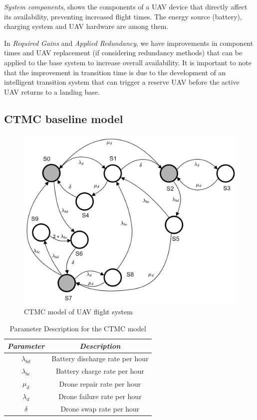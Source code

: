 \documentclass[conference]{IEEEtran}
\begin{document}
\textit{System components}, shows the components of a UAV device that directly affect its availability, preventing increased flight times. The energy source (battery), charging system and UAV hardware are among them.

In \textit{Required Gains} and \textit{Applied Redundancy}, we have improvements in component times and UAV replacement (if considering redundancy methods) that can be applied to the base system to increase overall availability. It is important to note that the improvement in transition time is due to the development of an intelligent transition system that can trigger a reserve UAV before the active UAV returns to a landing base.

\subsection{CTMC baseline model}


\begin{figure}[htbp]
\centerline{\includegraphics[scale=0.75]{img/CTMC_transparent.png}}
\caption{CTMC model of UAV flight system}
\label{fig:ctmc_model}
\end{figure}

\begin{table}[htbp]
\caption{Parameter Description for the CTMC model}
\begin{center}
\begin{tabular}{|c|c|}
\hline
\textbf{\textit{Parameter}}& \textbf{\textit{Description}} \\
\hline
  \(\lambda_{bd}\) & Battery discharge rate per hour \\
  \(\lambda_{bc}\)  & Battery charge rate per hour\\
 \(\mu_{d}\) & Drone repair rate per hour  \\
 \(\lambda_{d}\) & Drone failure rate per hour \\
 \(\delta\) & Drone swap rate per hour \\
\hline
\end{tabular}
\label{tab:ctmc_parameter_description}
\end{center}
\end{table}
\end{document}
